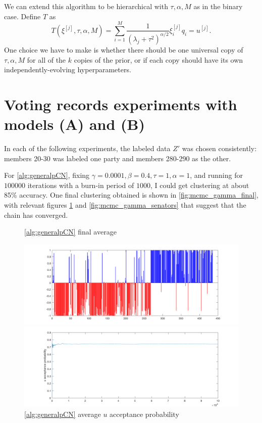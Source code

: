 \documentclass{siamart1116}
\begin{document}
        We can extend this algorithm to be hierarchical with $\tau, \alpha, M$ as in the binary case. Define $T$ as
         \[T(\xi^{[j]}, \tau, \alpha, M) = \sum_{i=1}^M \frac{1}{(\lambda_j + \tau^2)^{\alpha/2}} \xi^{[j]}_i q_i = u^{[j]}.\]
         One choice we have to make is whether there should be one universal copy of $\tau, \alpha, M$ for all of the $k$ copies of the prior, or if each copy should have its own independently-evolving hyperparameters.
\iffalse

\section{Voting records experiments with models (A) and (B)}
    In each of the following experiments, the labeled data $Z'$ was chosen consistently: members 20-30 was labeled one party and members 280-290 as the other.

    For \cref{alg:generalpCN}, fixing $\gamma = 0.0001, \beta = 0.4, \tau = 1, \alpha = 1$, and running for $100000$ iterations with a burn-in period of $1000$, I could get clustering at about 85\% accuracy. One final clustering obtained is shown in \cref{fig:mcmc_gamma_final}, with relevant figures \cref{fig:mcmc_gamma_acceptance} and \cref{fig:mcmc_gamma_senators} that suggest that the chain has converged.
    \begin{figure}[!htb]
    \begin{minipage}{0.48\textwidth}
        \caption{\label{fig:mcmc_gamma_final} \cref{alg:generalpCN} final average}
        \includegraphics[width = \linewidth]{voting/mcmc_gamma/final_avg.png}
    \end{minipage}\hfill
    \begin{minipage}{0.48\textwidth}
        \caption{\label{fig:mcmc_gamma_acceptance} \cref{alg:generalpCN} average $u$ acceptance probability}
        \includegraphics[width=\linewidth]{voting/mcmc_gamma/u_accept.png}
    \end{minipage}
    \end{figure}
\end{document}
